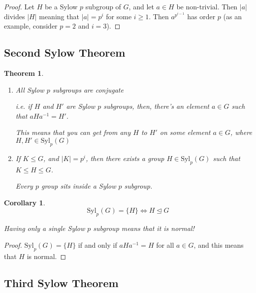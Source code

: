 \documentclass[12pt]{article}
\def\Syl{\text{Syl}}
\newtheorem{theorem}{Theorem}
\newtheorem{corollary}{Corollary}
\theoremstyle{remark}
\theoremstyle{remark}
\theoremstyle{remark}
\theoremstyle{remark}
\theoremstyle{remark}
\begin{document}
\begin{proof}
  Let $H$ be a Sylow $p$ subgroup of $G$, and let $a \in H$ be non-trivial. Then
  $|a|$ divides $|H|$ meaning that $|a| = p^i$ for some $i \ge 1$. Then $a^{p^{i
  - 1}}$ has order $p$ (as an example, consider $p = 2$ and $i = 3$).
\end{proof}

\subsection{Second Sylow Theorem}

\begin{theorem}
  \begin{enumerate}
    \item All Sylow $p$ subgroups are conjugate

      i.e. if $H$ and $H'$ are Sylow $p$ subgroups, then, there's an element $a
      \in G$ such that $aHa^{-1} = H'$.

      This means that you can get from any $H$ to $H'$ on some element $a \in G$,
      where $H, H' \in \Syl_p(G)$

    \item If $K \le G$, and $|K| = p^i$, then there exists a group $H \in
      \Syl_p(G)$ such that $K \le H \le G$.

      Every $p$ group sits inside a Sylow $p$ subgroup.
  \end{enumerate}
\end{theorem}

\begin{corollary}
  \[
    \Syl_p(G) = \{H\} \Leftrightarrow H \trianglelefteq G
  \]

  Having only a single Sylow $p$ subgroup means that it is normal!
  \end{corollary}

\begin{proof}
  $\Syl_p(G) = \{H\}$ if and only if $aHa^{-1} = H$ for all $a \in G$,
  and this means that $H$ is normal.
\end{proof}

\subsection{Third Sylow Theorem}
\end{document}
